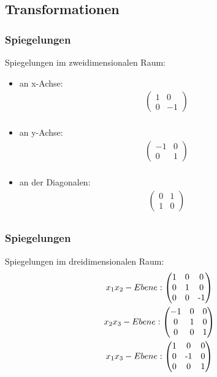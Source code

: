 \subsection{Transformationen}

\begin{frame}
	\frametitle{Spiegelungen}
	Spiegelungen im zweidimensionalen Raum:
	\begin{itemize}
		\item an x-Achse: \begin{gather*} \begin{pmatrix}
			1 & 0 \\
			0 & -1
			\end{pmatrix} \\ \end{gather*}
		\item an y-Achse:  \begin{gather*} \begin{pmatrix}
			-1 & 0 \\
			0 & 1
		\end{pmatrix} \\ \end{gather*}
		\item an der Diagonalen: \begin{gather*} \begin{pmatrix}
			0 & 1 \\
			1 & 0
			\end{pmatrix} \\ \end{gather*}
	\end{itemize}
\end{frame}

\begin{frame}
	\frametitle{Spiegelungen}
	Spiegelungen im dreidimensionalen Raum:
		\begin{gather*} x_{1}x_{2}-Ebene: \begin{pmatrix}
			1 & 0 & 0\\
			0 & 1 & 0\\
			0 & 0 & $-1$
			\end{pmatrix} \\
		x_{2}x_{3}-Ebene: \begin{pmatrix}
			-1 & 0 & 0\\
			0 & 1 & 0\\
			0 & 0 & 1
		\end{pmatrix} \\
		x_{1}x_{3}-Ebene: \begin{pmatrix}
			1 & 0 & 0\\
			0 & $-1$ & 0\\
			0 & 0 & 1
		\end{pmatrix} \\ \end{gather*}
\end{frame}

